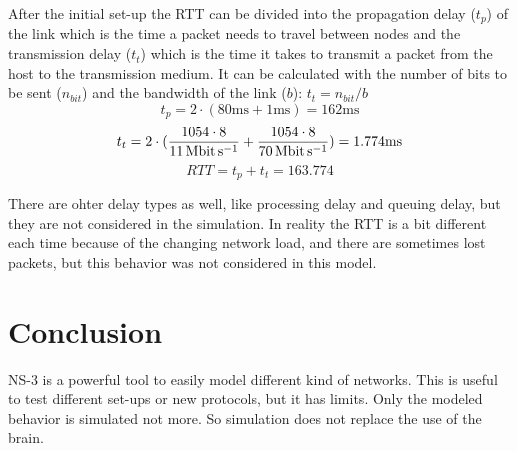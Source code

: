 \documentclass[parskip=full]{scrartcl}
\begin{document}
After the initial set-up the RTT can be divided into the propagation delay ($ t_p $) of the link which is the time a packet needs to travel between nodes and the transmission delay ($ t_t $) which is the time it takes to transmit a packet from the host to the transmission medium.  It can be calculated with the number of bits to be sent ($n_{bit}$) and the bandwidth of the link ($b$): $ t_t = n_{bit}/b$
\[t_p = 2\cdot(80 \si{\milli\second}+1 \si{\milli\second}) = 162 \si{\milli\second} \]
\[t_t = 2\cdot(\frac{1054\cdot8}{\SI{11}{\mega\bit\per\second}} +\frac{1054\cdot8}{\SI{70}{\mega\bit\per\second}}) = 1.774\si{\milli\second} \]
\[ RTT = t_p + t_t = 163.774 \]

There are ohter delay types as well, like processing delay and queuing delay, but they are not considered in the simulation. 
In reality the RTT is a bit different each time because of the changing network load, and there are sometimes lost packets,  but this behavior was not considered in this model.




\section{Conclusion}
NS-3 is a powerful tool to easily model different kind of networks. This is useful to test different set-ups or new protocols, but it has limits.
Only the modeled behavior is simulated not more. 
So simulation does not replace the use of the brain.



\printbibliography
\end{document}
